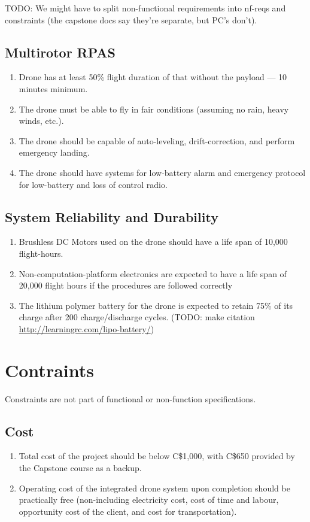 \documentclass[10pt,letterpaper]{article}
\begin{document}
TODO: We might have to split non-functional requirements into nf-reqs and constraints (the capstone docs say they're separate, but PC's don't).

\subsection{Multirotor RPAS}
\begin{enumerate}[{NF.FP}.1:]
    \item Drone has at least 50\% flight duration of that without the payload --- 10 minutes minimum.
    \item The drone must be able to fly in fair conditions (assuming no rain, heavy winds, etc.).
    \item The drone should be capable of auto-leveling, drift-correction, and perform emergency landing.
    \item The drone should have systems for low-battery alarm and emergency protocol for low-battery and loss of control radio.
\end{enumerate}

\subsection{System Reliability and Durability}
\begin{enumerate}[{NF.SR}.1:]
    \item Brushless DC Motors used on the drone should have a life span of 10,000 flight-hours.
    \item Non-computation-platform electronics are expected to have a life span of 20,000 flight hours if the procedures are followed correctly
    \item The lithium polymer battery for the drone is expected to retain 75\% of its charge after 200 charge/discharge cycles. (TODO: make citation \url{http://learningrc.com/lipo-battery/}) 
\end{enumerate}

\section{Contraints}

Constraints are not part of functional or non-function specifications.

\subsection{Cost}
\begin{enumerate}[{C.CT}.1:]
    \item Total cost of the project should be below C\$1,000, with C\$650 provided by the Capstone course as a backup.
    \item Operating cost of the integrated drone system upon completion should be practically free (non-including electricity cost, cost of time and labour, opportunity cost of the client, and cost for transportation).
\end{enumerate}
\end{document}
